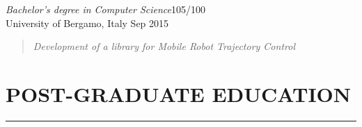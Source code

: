\documentclass[10pt]{article}
\newcommand{\cvsection}[1]{\section*{\centering\normalsize\uppercase{#1}}\vspace{-16pt}\rule{\linewidth}{0.2pt}}
\begin{document}
\vspace{6pt} %

\textit{Bachelor's degree in Computer Science}\hfill 105\slash100\\
University of Bergamo, Italy \hfill Sep 2015
\vspace{-3pt}
\begin{quote}
	\textit{Development of a library for Mobile Robot Trajectory Control}
\end{quote}


\clearpage


\cvsection{post-graduate education}
\end{document}
